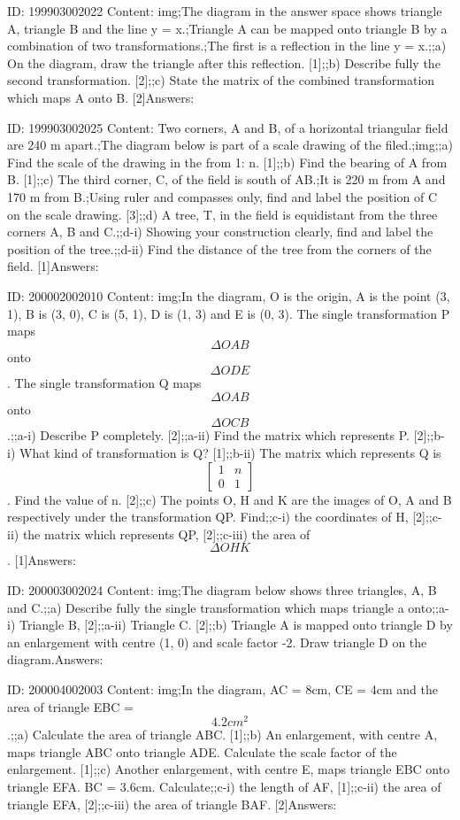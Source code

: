 \documentclass{article}
\begin{document}
ID: 199903002022
Content:
img;The diagram in the answer space shows triangle A, triangle B and the line y = x.;Triangle A can be mapped onto triangle B by a combination of two transformations.;The first is a reflection in the line y = x.;;a) On the diagram, draw the triangle after this reflection. [1];;b) Describe fully the second transformation. [2];;c) State the matrix of the combined transformation which maps A onto B. [2]Answers:

ID: 199903002025
Content:
Two corners, A and B, of a horizontal triangular field are 240 m apart.;The diagram below is part of a scale drawing of the filed.;img;;a) Find the scale of the drawing in the from 1: n. [1];;b) Find the bearing of A from B. [1];;c) The third corner, C, of the field is south of AB.;It is 220 m from A and 170 m from B.;Using ruler and compasses only, find and label the position of C on the scale drawing.   [3];;d) A tree, T, in the field is equidistant from the three corners A, B and C.;;d-i) Showing your construction clearly, find and label the position of the tree.;;d-ii) Find the distance of the tree from the corners of the field.   [1]Answers:

ID: 200002002010
Content:
img;In the diagram, O is the origin, A is the point (3, 1), B is (3, 0), C is (5, 1), D is (1, 3) and E is (0, 3). The single transformation P maps $$\Delta  OAB$$ onto $$\Delta  ODE$$. The single transformation Q maps $$\Delta  OAB$$ onto $$\Delta  OCB$$.;;a-i) Describe P completely. [2];;a-ii) Find the matrix which represents P. [2];;b-i) What kind of transformation is Q? [1];;b-ii) The matrix which represents Q is $$\begin{bmatrix}1&n\\0&1\end{bmatrix}$$. Find the value of n. [2];;c) The points O, H and K are the images of O, A and B respectively under the transformation QP. Find;;c-i) the coordinates of H, [2];;c-ii) the matrix which represents QP, [2];;c-iii) the area of $$\Delta  OHK$$. [1]Answers:

ID: 200003002024
Content:
img;The diagram below shows three triangles, A, B and C.;;a) Describe fully the single transformation which maps triangle a onto;;a-i) Triangle B, [2];;a-ii) Triangle C. [2];;b) Triangle A is mapped onto triangle D by an enlargement with centre (1, 0) and scale factor -2. Draw triangle D on the diagram.Answers:

ID: 200004002003
Content:
img;In the diagram, AC = 8cm, CE = 4cm and the area of triangle EBC = $$4.2cm^2$$.;;a) Calculate the area of triangle ABC. [1];;b) An enlargement, with centre A, maps triangle ABC onto triangle ADE. Calculate the scale factor of the enlargement. [1];;c) Another enlargement, with centre E, maps triangle EBC onto triangle EFA. BC = 3.6cm. Calculate;;c-i) the length of AF, [1];;c-ii) the area of triangle EFA, [2];;c-iii) the area of triangle BAF. [2]Answers:
\end{document}
